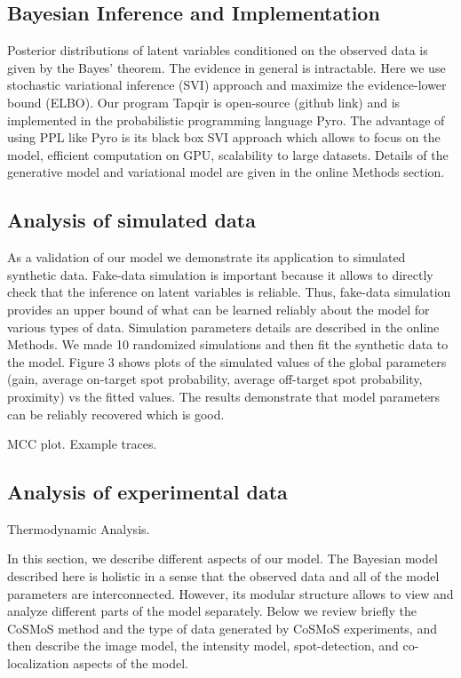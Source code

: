 \subsection{Bayesian Inference and Implementation}

Posterior distributions of latent variables conditioned on the observed data is given by the Bayes' theorem. The evidence in general is intractable. Here we use stochastic variational inference (SVI) approach and maximize the evidence-lower bound (ELBO). Our program Tapqir is open-source (github link) and is implemented in the probabilistic programming language Pyro. The advantage of using PPL like Pyro is its black box SVI approach which allows to focus on the model, efficient computation on GPU, scalability to large datasets. Details of the generative model and variational model are given in the online Methods section.

\subsection{Analysis of simulated data}

As a validation of our model we demonstrate its application to simulated synthetic data. Fake-data simulation is important because it allows to directly check that the inference on latent variables is reliable. Thus, fake-data simulation provides an upper bound of what can be learned reliably about the model for various types of data. Simulation parameters details are described in the online Methods. We made 10 randomized simulations and then fit the synthetic data to the model. Figure 3 shows plots of the simulated values of the global parameters (gain, average on-target spot probability, average off-target spot probability, proximity) vs the fitted values. The results demonstrate that model parameters can be reliably recovered which is good.

MCC plot. Example traces.

\subsection{Analysis of experimental data}

Thermodynamic Analysis.

In this section, we describe different aspects of our model. The Bayesian model described here is holistic in a sense that the observed data and all of the model parameters are interconnected. However, its modular structure allows to view and analyze different parts of the model separately. Below we review briefly the CoSMoS method and the type of data generated by CoSMoS experiments, and then describe the image model, the intensity model, spot-detection, and co-localization aspects of the model.

